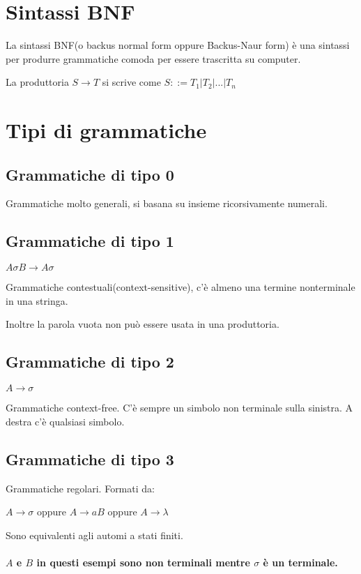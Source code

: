 \documentclass[a4paper, 10pt]{article}
\begin{document}
\section{Sintassi BNF}

La sintassi BNF(o backus normal form oppure Backus-Naur form) è una sintassi per produrre grammatiche comoda per essere trascritta su computer.

La produttoria $S \rightarrow T$ si scrive come $S ::= T_1 | T_2 | ... | T_n$
 
\section{Tipi di grammatiche}

\subsection{Grammatiche di tipo 0}

Grammatiche molto generali, si basana su insieme ricorsivamente numerali.

\subsection{Grammatiche di tipo 1}

$A \sigma B \rightarrow A\sigma$

Grammatiche contestuali(context-sensitive), c'è almeno una termine nonterminale in una stringa.

Inoltre la parola vuota non può essere usata in una produttoria.

\subsection{Grammatiche di tipo 2}

$A \rightarrow \sigma$

Grammatiche context-free. C'è sempre un simbolo non terminale sulla sinistra. A destra c'è qualsiasi simbolo.

\subsection{Grammatiche di tipo 3}

Grammatiche regolari. Formati da:

$A \rightarrow \sigma$ oppure $A \rightarrow aB$ oppure $A \rightarrow \lambda$

Sono equivalenti agli automi a stati finiti. 
\\\\
\textbf{$A$ e $B$ in questi esempi sono non terminali mentre $\sigma$ è un terminale.}
\end{document}
